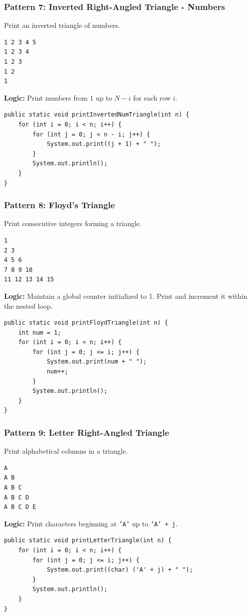 \documentclass[12pt,a4paper,oneside]{book}
\begin{document}
\subsubsection{Pattern 7: Inverted Right-Angled Triangle - Numbers}
Print an inverted triangle of numbers.
\begin{lstlisting}[frame=single]
1 2 3 4 5
1 2 3 4
1 2 3
1 2
1
\end{lstlisting}
\textbf{Logic:} Print numbers from $1$ up to $N-i$ for each row $i$.
\begin{lstlisting}[caption={Inverted Right-Angled Triangle - Numbers}]
public static void printInvertedNumTriangle(int n) {
    for (int i = 0; i < n; i++) {
        for (int j = 0; j < n - i; j++) {
            System.out.print((j + 1) + " ");
        }
        System.out.println();
    }
}
\end{lstlisting}

\subsubsection{Pattern 8: Floyd's Triangle}
Print consecutive integers forming a triangle.
\begin{lstlisting}[frame=single]
1
2 3
4 5 6
7 8 9 10
11 12 13 14 15
\end{lstlisting}
\textbf{Logic:} Maintain a global counter initialized to 1. Print and increment it within the nested loop.
\begin{lstlisting}[caption={Floyd's Triangle}]
public static void printFloydTriangle(int n) {
    int num = 1;
    for (int i = 0; i < n; i++) {
        for (int j = 0; j <= i; j++) {
            System.out.print(num + " ");
            num++;
        }
        System.out.println();
    }
}
\end{lstlisting}

\subsubsection{Pattern 9: Letter Right-Angled Triangle}
Print alphabetical columns in a triangle.
\begin{lstlisting}[frame=single]
A
A B
A B C
A B C D
A B C D E
\end{lstlisting}
\textbf{Logic:} Print characters beginning at \texttt{'A'} up to \texttt{'A' + j}.
\begin{lstlisting}[caption={Letter Right-Angled Triangle}]
public static void printLetterTriangle(int n) {
    for (int i = 0; i < n; i++) {
        for (int j = 0; j <= i; j++) {
            System.out.print((char) ('A' + j) + " ");
        }
        System.out.println();
    }
}
\end{lstlisting}
\end{document}
